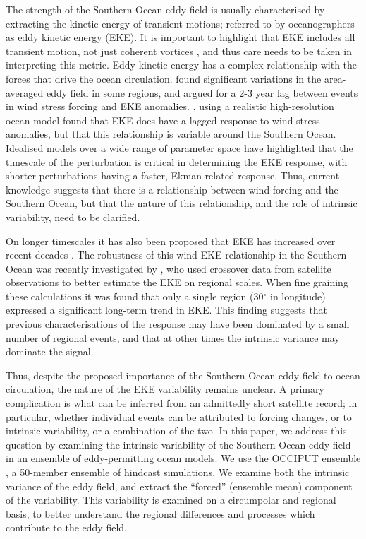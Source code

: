 \documentclass{agujournal2019}
\begin{document}
The strength of the Southern Ocean eddy field is usually characterised by extracting the kinetic energy of transient motions; referred to by oceanographers as eddy kinetic energy (EKE). 
It is important to highlight that EKE includes all transient motion, not just coherent vortices \citep{Martinez-Moreno2019}, and thus care needs to be taken in interpreting this metric.
Eddy kinetic energy has a complex relationship with the forces that drive the ocean circulation.
\citet{Meredith-Hogg-2006} found significant variations in the area-averaged eddy field in some regions, and argued for a 2-3 year lag between events in wind stress forcing and EKE anomalies.
\citet{Patara2016}, using a realistic high-resolution ocean model found that EKE does have a lagged response to wind stress anomalies, but that this relationship is variable around the Southern Ocean.
Idealised models over a wide range of parameter space \citep{Sinha2016} have highlighted that the timescale of the perturbation is critical in determining the EKE response, with shorter perturbations having a faster, Ekman-related response.
Thus, current knowledge suggests that there is a relationship between wind forcing and the Southern Ocean, but that the nature of this relationship, and the role of intrinsic variability, need to be clarified.

On longer timescales it has also been proposed that EKE has increased over recent decades \citep{Hogg2015, Martinez-Moreno2019}.
The robustness of this wind-EKE relationship in the Southern Ocean was recently investigated by \citet{Zhang2021}, who used crossover data from satellite observations \citep[as in][]{Hogg2015} to better estimate the EKE on regional scales. 
When fine graining these calculations it was found that only a single region (30$^\circ$ in longitude) expressed a significant long-term trend in EKE.
This finding  suggests that previous characterisations of the response may have been dominated by a small number of regional events, and that at other times the intrinsic variance may dominate the signal.

Thus, despite the proposed importance of the Southern Ocean eddy field to ocean circulation, the nature of the EKE variability remains unclear.
A primary complication is what can be inferred from an admittedly short satellite record; in particular, whether individual events can be attributed to forcing changes, or to intrinsic variability, or a combination of the two.
In this paper, we address this question by examining the intrinsic variability of the Southern Ocean eddy field in an ensemble of eddy-permitting  ocean models.
We use the OCCIPUT ensemble \citep{Leroux2018}, a 50-member ensemble of hindcast simulations.
We examine both the intrinsic variance of the eddy field, and extract the ``forced'' (ensemble mean) component of the variability.
This variability is examined on a circumpolar and regional basis, to better understand the regional differences and processes which contribute to the eddy field.
\end{document}
